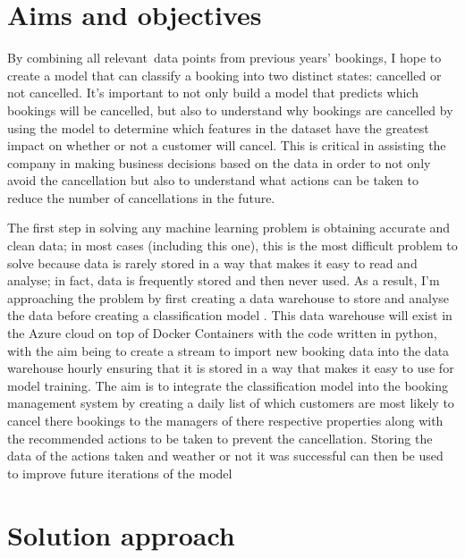\section{Aims and objectives}

By combining all relevant data points from previous years' bookings, I hope to create a model that can classify a booking into two distinct states: cancelled or not cancelled. It's important to not only build a model that predicts which bookings will be cancelled, but also to understand why bookings are cancelled by using the model to determine which features in the dataset have the greatest impact on whether or not a customer will cancel. This is critical in assisting the company in making business decisions based on the data in order to not only avoid the cancellation but also to understand what actions can be taken to reduce the number of cancellations in the future.

\vspace{5mm}

The first step in solving any machine learning problem is obtaining accurate and clean data; in most cases (including this one), this is the most difficult problem to solve because data is rarely stored in a way that makes it easy to read and analyse; in fact, data is frequently stored and then never used. As a result, I'm approaching the problem by first creating a data warehouse to store and analyse the data before creating a classification model \cite{SessionsTHEALGORITHMS}. This data warehouse will exist in the Azure cloud on top of Docker Containers with the code written in python, with the aim being to create a stream to import new booking data into the data warehouse hourly ensuring that it is stored in a way that makes it easy to use for model training. The aim is to integrate the classification model into the booking management system by creating a daily list of which customers are most likely to cancel there bookings to the managers of there respective properties along with the recommended actions to be taken to prevent the cancellation. Storing the data of the actions taken and weather or not it was successful can then be used to improve future iterations of the model

\section{Solution approach}

